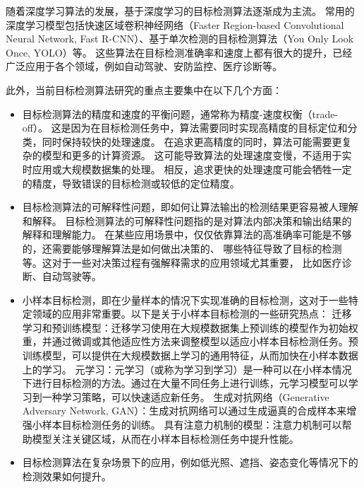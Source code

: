 随着深度学习算法的发展，基于深度学习的目标检测算法逐渐成为主流。
常用的深度学习模型包括快速区域卷积神经网络（Faster Region-based Convolutional Neural Network, Fast R-CNN）\cite{girshick2015fast}、基于单次检测的目标检测算法（You Only Look Once, YOLO）\cite{jiang2022review}等。
这些算法在目标检测准确率和速度上都有很大的提升，已经广泛应用于各个领域，例如自动驾驶、安防监控、医疗诊断等。
\par
此外，当前目标检测算法研究的重点主要集中在以下几个方面：
\begin{itemize}[itemindent=2em]
    \item 目标检测算法的精度和速度的平衡问题，通常称为精度-速度权衡（trade-off）。
    这是因为在目标检测任务中，算法需要同时实现高精度的目标定位和分类，同时保持较快的处理速度。
    在追求更高精度的同时，算法可能需要更复杂的模型和更多的计算资源。
    这可能导致算法的处理速度变慢，不适用于实时应用或大规模数据集的处理。
    相反，追求更快的处理速度可能会牺牲一定的精度，导致错误的目标检测或较低的定位精度。
    
    \item 目标检测算法的可解释性问题，即如何让算法输出的检测结果更容易被人理解和解释。
    目标检测算法的可解释性问题指的是对算法内部决策和输出结果的解释和理解能力。
    在某些应用场景中，仅仅依靠算法的高准确率可能是不够的，还需要能够理解算法是如何做出决策的、
    哪些特征导致了目标的检测等。这对于一些对决策过程有强解释需求的应用领域尤其重要，
    比如医疗诊断、自动驾驶等。
    
    \item 小样本目标检测，即在少量样本的情况下实现准确的目标检测，这对于一些特定领域的应用非常重要。以下是关于小样本目标检测的一些研究热点：
    迁移学习和预训练模型\cite{zhuang2020comprehensive}：迁移学习使用在大规模数据集上预训练的模型作为初始权重，并通过微调或其他适应性方法来调整模型以适应小样本目标检测任务。预训练模型，可以提供在大规模数据上学习的通用特征，从而加快在小样本数据上的学习。
    元学习\cite{hospedales2021meta}：元学习（或称为学习到学习）是一种可以在小样本情况下进行目标检测的方法。通过在大量不同任务上进行训练，元学习模型可以学习到一种学习策略，可以快速适应新任务。
    生成对抗网络（Generative Adversary Network, GAN）：生成对抗网络可以通过生成逼真的合成样本来增强小样本目标检测任务的训练。
    具有注意力机制的模型：注意力机制可以帮助模型关注关键区域，从而在小样本目标检测任务中提升性能。
    
    \item 目标检测算法在复杂场景下的应用，例如低光照、遮挡、姿态变化等情况下的检测效果如何提升。
    
\end{itemize}


